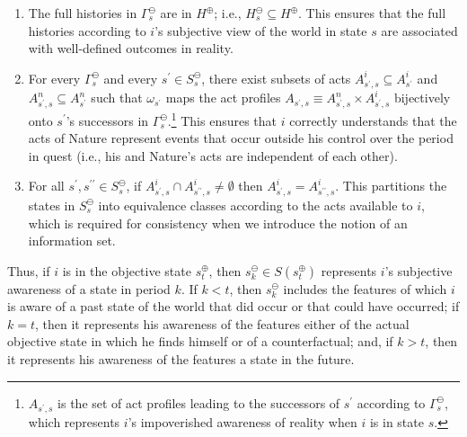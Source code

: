 \documentclass[
11pt,
titlepage,
reqno,
]{article}%
\theoremstyle{definition}
\begin{document}
\begin{enumerate}
	\item The full histories in $\Gamma^\ominus_s$ are in $H^\oplus$; i.e., $H^\ominus_s\subseteq H^\oplus$. 
	This ensures that the full histories according to $i$'s subjective view of the world in state $s$ are associated with well-defined outcomes in reality.
	\item For every  $\Gamma^\ominus_s$ and every $s^\prime\in S^\ominus_s$, there exist subsets of acts $A^i_{s^\prime,s}\subseteq A^i_{s^\prime}$ and $A^n_{s^\prime,s}\subseteq A^n_{s^\prime}$ such that $\omega_{s^\prime}$ maps the act profiles $A_{s^\prime,s}\equiv A^n_{s^\prime,s}\times A^i_{s^\prime,s}$ bijectively onto $s^\prime$'s successors in $\Gamma^\ominus_s$.\footnote
	{
		$A_{s^\prime,s}$ is the set of act profiles leading to the successors of $s^\prime$ according to $\Gamma^\ominus_s$, which represents $i$'s impoverished awareness of reality when $i$ is  in state $s$. 
	}
	This ensures that $i$ correctly understands that the acts of Nature represent events that occur outside his control over the period in quest (i.e., his and Nature's acts are independent of each other).
	\item For all $s^\prime,s^{\prime\prime}\in S^\ominus_s$, if $A^i_{s^\prime,s}\cap A^i_{s^{\prime\prime},s}\ne \emptyset$ then $A^i_{s^\prime,s}= A^i_{s^{\prime\prime},s}$.
	This partitions the states in $S^\ominus_s$ into equivalence classes according to the acts available to $i$, which is required for consistency when we introduce the notion of an information set.
\end{enumerate}





Thus, if $i$ is in the objective state $s^\oplus_t$, then  $s^\ominus_k\in S(s^\oplus_t)$ represents $i$'s subjective awareness of a state in period $k$.
If $k<t$, then  $s^\ominus_k$ includes the features of which $i$ is aware of a past state of the world that did occur or that could have occurred; if $k=t$, then  it represents his awareness of the features either of the actual objective state in which he finds himself or of a counterfactual; and, if $k>t$, then  it represents his awareness of the features a state in the future.
\end{document}
